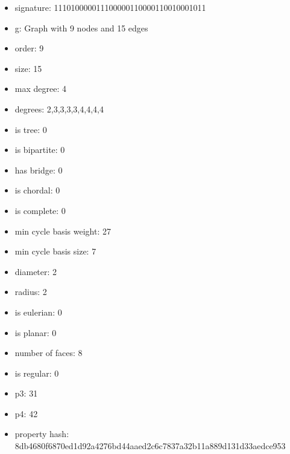 \begin{figure}
\end{figure}
\begin{itemize}
\item signature: 111010000011100000110000110010001011
\item g: Graph with 9 nodes and 15 edges
\item order: 9
\item size: 15
\item max degree: 4
\item degrees: 2,3,3,3,3,4,4,4,4
\item is tree: 0
\item is bipartite: 0
\item has bridge: 0
\item is chordal: 0
\item is complete: 0
\item min cycle basis weight: 27
\item min cycle basis size: 7
\item diameter: 2
\item radius: 2
\item is eulerian: 0
\item is planar: 0
\item number of faces: 8
\item is regular: 0
\item p3: 31
\item p4: 42
\item property hash: 8db4680f6870ed1d92a4276bd44aaed2c6c7837a32b11a889d131d33aedce953
\end{itemize}
\newpage
